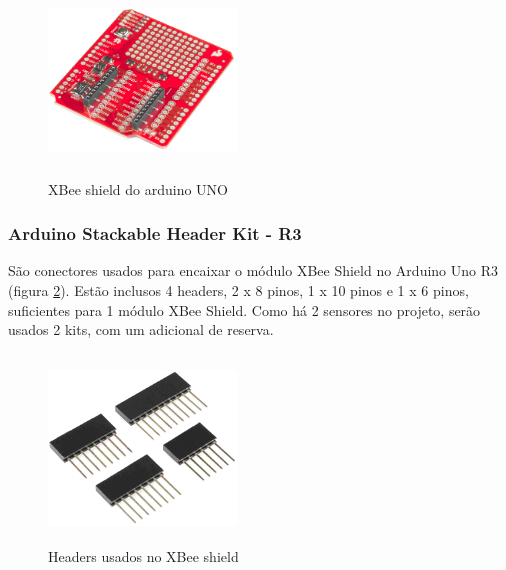 \begin{figure}[H]
\begin{center}
\includegraphics[width=5cm,height=5cm,keepaspectratio]{figuras/xbee_shield.png}
\caption{\label{fig:xbee shield} XBee shield do arduino UNO}
\end{center}
\end{figure}

\subsubsection{Arduino Stackable Header Kit - R3}

São conectores usados para encaixar o módulo XBee Shield no Arduino Uno R3 (figura \ref{fig:xbee shield headers}). Estão inclusos 4 headers, 2 x 8 pinos, 1 x 10 pinos e 1 x 6 pinos, suficientes para 1 módulo XBee Shield. Como há 2 sensores no projeto, serão usados 2 kits, com um adicional de reserva.

\begin{figure}[H]
\begin{center}
\includegraphics[width=5cm,height=5cm,keepaspectratio]{figuras/headers.png}
\caption{\label{fig:xbee shield headers} Headers usados no XBee shield}
\end{center}
\end{figure}
